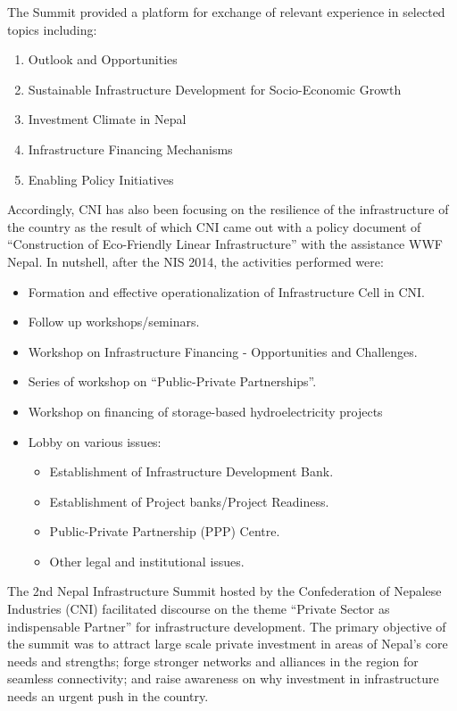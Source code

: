 \documentclass[
]{book}
\providecommand{\tightlist}{%
  \setlength{\itemsep}{0pt}\setlength{\parskip}{0pt}}
\begin{document}
The Summit provided a platform for exchange of relevant experience in selected topics including:

\begin{enumerate}
\item Outlook and Opportunities
\item Sustainable Infrastructure Development for Socio-Economic Growth
\item Investment Climate in Nepal
\item Infrastructure Financing Mechanisms
\item Enabling Policy Initiatives
\end{enumerate}

Accordingly, CNI has also been focusing on the resilience of the infrastructure of the country as the result of which CNI came out with a policy document of ``Construction of Eco-Friendly Linear Infrastructure'' with the assistance WWF Nepal. In nutshell, after the NIS 2014, the activities performed were:

\begin{itemize}
\tightlist
\item
  Formation and effective operationalization of Infrastructure Cell in CNI.
\item
  Follow up workshops/seminars.
\item
  Workshop on Infrastructure Financing - Opportunities and Challenges.
\item
  Series of workshop on ``Public-Private Partnerships''.
\item
  Workshop on financing of storage-based hydroelectricity projects
\item
  Lobby on various issues:

  \begin{itemize}
  \tightlist
  \item
    Establishment of Infrastructure Development Bank.
  \item
    Establishment of Project banks/Project Readiness.
  \item
    Public-Private Partnership (PPP) Centre.
  \item
    Other legal and institutional issues.
  \end{itemize}
\end{itemize}

The 2nd Nepal Infrastructure Summit hosted by the Confederation of Nepalese Industries (CNI) facilitated discourse on the theme ``Private Sector as indispensable Partner'' for infrastructure development. The primary objective of the summit was to attract large scale private investment in areas of Nepal's core needs and strengths; forge stronger networks and alliances in the region for seamless connectivity; and raise awareness on why investment in infrastructure needs an urgent push in the country.
\end{document}

